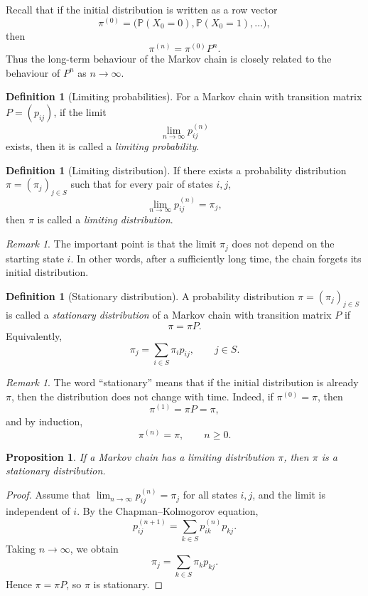 \documentclass[11pt]{article}
\theoremstyle{plain}
\newtheorem{proposition}[theorem]{Proposition}
\theoremstyle{definition}
\newtheorem{definition}[theorem]{Definition}
\theoremstyle{remark}
\newtheorem{remark}[theorem]{Remark}
\begin{document}
	Recall that if the initial distribution is written as a row vector
	\[
	\pi^{(0)}=\bigl(\mathbb{P}(X_0=0),\mathbb{P}(X_0=1),\dots\bigr),
	\]
	then
	\[
	\pi^{(n)}=\pi^{(0)}P^n.
	\]
	Thus the long-term behaviour of the Markov chain is closely related to the behaviour of \(P^n\) as \(n\to\infty\).
	
	\begin{definition}[Limiting probabilities]
		For a Markov chain with transition matrix \(P=(p_{ij})\), if the limit
		\[
		\lim_{n\to\infty}p_{ij}^{(n)}
		\]
		exists, then it is called a \emph{limiting probability}.
	\end{definition}
	
	\begin{definition}[Limiting distribution]
		If there exists a probability distribution \(\pi=(\pi_j)_{j\in S}\) such that for every pair of states \(i,j\),
		\[
		\lim_{n\to\infty}p_{ij}^{(n)}=\pi_j,
		\]
		then \(\pi\) is called a \emph{limiting distribution}.
	\end{definition}
	
	\begin{remark}
		The important point is that the limit \(\pi_j\) does not depend on the starting state \(i\). In other words, after a sufficiently long time, the chain forgets its initial distribution.
	\end{remark}
	
	
	
	
	\begin{definition}[Stationary distribution]
		A probability distribution \(\pi=(\pi_j)_{j\in S}\) is called a \emph{stationary distribution} of a Markov chain with transition matrix \(P\) if
		\[
		\pi=\pi P.
		\]
		Equivalently,
		\[
		\pi_j=\sum_{i\in S}\pi_i p_{ij},
		\qquad j\in S.
		\]
	\end{definition}
	
	\begin{remark}
		The word ``stationary'' means that if the initial distribution is already \(\pi\), then the distribution does not change with time. Indeed, if \(\pi^{(0)}=\pi\), then
		\[
		\pi^{(1)}=\pi P=\pi,
		\]
		and by induction,
		\[
		\pi^{(n)}=\pi,
		\qquad n\ge 0.
		\]
	\end{remark}
	
	\begin{proposition}
		If a Markov chain has a limiting distribution \(\pi\), then \(\pi\) is a stationary distribution.
	\end{proposition}
	
	\begin{proof}
		Assume that \(\lim_{n\to\infty}p_{ij}^{(n)}=\pi_j\) for all states \(i,j\), and the limit is independent of \(i\). By the Chapman--Kolmogorov equation,
		\[
		p_{ij}^{(n+1)}
		=
		\sum_{k\in S}p_{ik}^{(n)}p_{kj}.
		\]
		Taking \(n\to\infty\), we obtain
		\[
		\pi_j
		=
		\sum_{k\in S}\pi_kp_{kj}.
		\]
		Hence \(\pi=\pi P\), so \(\pi\) is stationary.
	\end{proof}
	
\end{document}
